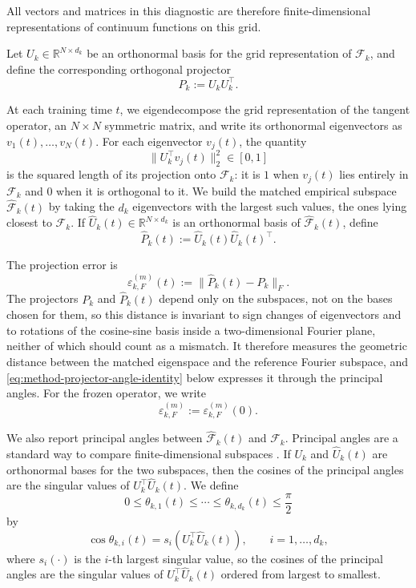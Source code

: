 All vectors and matrices in this diagnostic are therefore finite-dimensional
representations of continuum functions on this grid.

Let \(U_k\in\mathbb R^{N\times d_k}\) be an orthonormal basis for the grid
representation of \(\mathcal F_k\), and define the corresponding orthogonal
projector
\begin{equation}
	P_k := U_kU_k^\top .
	\label{eq:method-fourier-projector}
\end{equation}

At each training time \(t\), we eigendecompose the grid representation of the
tangent operator, an \(N\times N\) symmetric matrix, and write its orthonormal
eigenvectors as \(v_1(t),\dots,v_N(t)\). For each eigenvector \(v_j(t)\), the
quantity
\[
	\|U_k^\top v_j(t)\|_2^2 \in [0,1]
\]
is the squared length of its projection onto \(\mathcal F_k\): it is \(1\) when
\(v_j(t)\) lies entirely in \(\mathcal F_k\) and \(0\) when it is orthogonal to
it. We build the matched empirical subspace \(\widehat{\mathcal F}_k(t)\) by taking
the \(d_k\) eigenvectors with the largest such values, the ones lying closest to
\(\mathcal F_k\). If \(\widehat U_k(t)\in\mathbb R^{N\times d_k}\) is an
orthonormal basis of \(\widehat{\mathcal F}_k(t)\), define
\begin{equation}
	\widehat P_k(t)
	:=
	\widehat U_k(t)\widehat U_k(t)^\top .
	\label{eq:method-empirical-projector}
\end{equation}

The projection error is
\begin{equation}
	\varepsilon_{k,F}^{(m)}(t)
	:=
	\|\widehat P_k(t)-P_k\|_F .
	\label{eq:method-projector-errors}
\end{equation}
The projectors \(P_k\) and \(\widehat P_k(t)\) depend only on the subspaces, not
on the bases chosen for them, so this distance is invariant to sign changes of
eigenvectors and to rotations of the cosine-sine basis inside a two-dimensional
Fourier plane, neither of which should count as a mismatch. It therefore measures
the geometric distance between the matched eigenspace and the reference Fourier
subspace, and \eqref{eq:method-projector-angle-identity} below expresses it
through the principal angles. For the frozen operator, we write
\[
	\varepsilon_{k,F}^{(m)}:=\varepsilon_{k,F}^{(m)}(0).
\]

We also report principal angles between
\(\widehat{\mathcal F}_k(t)\) and \(\mathcal F_k\). Principal angles are a
standard way to compare finite-dimensional subspaces
\citep{bjorck1973numerical}. If \(U_k\) and \(\widehat U_k(t)\) are orthonormal
bases for the two subspaces, then the cosines of the principal angles are the
singular values of \(U_k^\top \widehat U_k(t)\). We define
\[
	0\le \theta_{k,1}(t)\le \cdots \le \theta_{k,d_k}(t)\le \frac{\pi}{2}
\]
by
\begin{equation}
	\cos\theta_{k,i}(t)
	=
	s_i(U_k^\top \widehat U_k(t)),
	\qquad i=1,\dots,d_k,
	\label{eq:method-principal-angles}
\end{equation}
where \(s_i(\cdot)\) is the \(i\)-th largest singular value, so the cosines of the
principal angles are the singular values of \(U_k^\top\widehat U_k(t)\) ordered
from largest to smallest.

